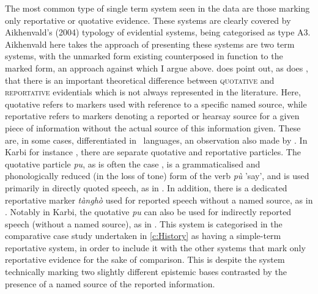 The most common type of single term system seen in the data are those marking only reportative or quotative evidence. These systems are clearly covered by Aikhenvald's (2004) typology of evidential systems, being categorised as type A3. Aikhenvald here takes the approach of presenting these systems are two term systems, with the unmarked form existing counterposed in function to the marked form, an approach against which I argue above.  does point out, as does , that there is an important theoretical difference between \textsc{quotative} and \textsc{reportative} evidentials which is not always represented in the literature. Here, quotative refers to markers used with reference to a specific named source, while reportative refers to markers denoting a reported or hearsay source for a given piece of information without the actual source of this information given. These are, in some cases, differentiated in \lfam\ languages, an observation also made by . In Karbi for instance \cite[Internal isolate: India,][560]{Konnerth2020}, there are separate quotative and reportative particles. The quotative particle \textit{pu}, as is often the case \cite{Gawne2021}, is a grammaticalised and phonologically reduced (in the loss of tone) form of the verb \textit{pù} 'say', and is used primarily in directly quoted speech, as in . In addition, there is a dedicated reportative marker \textit{tànghò} used for reported speech without a named source, as in . Notably in Karbi, the quotative \textit{pu} can also be used for indirectly reported speech (without a named source), as in . This system is categorised in the comparative case study undertaken in \cref{c:History} as having a simple-term reportative system, in order to include it with the other systems that mark only reportative evidence for the sake of comparison. This is despite the system technically marking two slightly different epistemic bases contrasted by the presence of a named source of the reported information.


